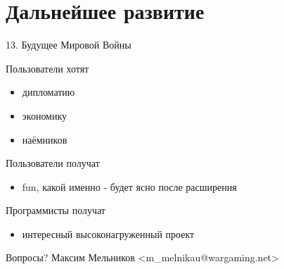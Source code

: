 \documentclass{beamer}
\begin{document}
\section{Дальнейшее развитие}
\begin{frame}{13. Будущее Мировой Войны}
    \begin{block}{Пользователи хотят}
        \begin{itemize}
            \item{дипломатию}
            \item{экономику}
            \item{наёмников}
        \end{itemize}
    \end{block}

    \pause
    \begin{block}{Пользователи получат}
        \begin{itemize}
            \item{fun, какой именно - будет ясно после расширения}
        \end{itemize}
    \end{block}

    \pause
    \begin{block}{Программисты получат}
        \begin{itemize}
            \item{интересный высоконагруженный проект}
        \end{itemize}
    \end{block}
\end{frame}

\begin{frame}{}
    \begin{block}{Вопросы?}
    Максим Мельников <m\_melnikau@wargaming.net>
    \end{block}
\end{frame}
\end{document}
